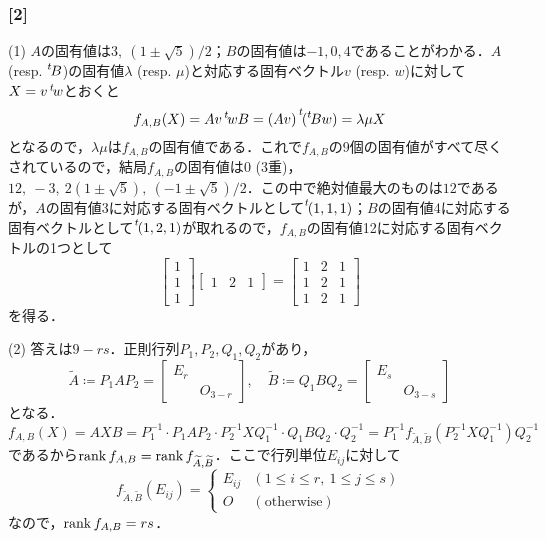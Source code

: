 \documentclass[a4j]{ltjsarticle}
\newcommand{\1}{\mathbbm{1}}
\newcommand{\transpose}[1]{\prescript{t\!}{}{#1}}
\numberwithin{equation}{section}
\theoremstyle{definition}
\begin{document}
\subsubsection*{[2]}
(1) $A$の固有値は$3,\ (1\pm\sqrt{5})/2$；$B$の固有値は$-1,0,4$であることがわかる．$A$ (resp. $\transpose{B}$)の固有値$\lambda$ (resp. $\mu$)と対応する固有ベクトル$v$ (resp. $w$)に対して$X=v\transpose{w}$とおくと 
\begin{equation}
    f_{A,B}(X)=Av\transpose{w}B=(Av)\transpose{(\transpose{B}w)}=\lambda\mu X
\end{equation}
となるので，$\lambda \mu$は$f_{A,B}$の固有値である．これで$f_{A,B}$の9個の固有値がすべて尽くされているので，結局$f_{A,B}$の固有値は$0$ (3重)，$12,\ -3,\ 2(1\pm \sqrt{5}),\ (-1\pm\sqrt{5})/2$．この中で絶対値最大のものは$12$であるが，$A$の固有値$3$に対応する固有ベクトルとして$\transpose{(1,1,1)}$；$B$の固有値$4$に対応する固有ベクトルとして$\transpose{(1,2,1)}$が取れるので，$f_{A,B}$の固有値12に対応する固有ベクトルの1つとして
\begin{equation}
    \begin{bmatrix}
        1\\
        1\\
        1
    \end{bmatrix}\begin{bmatrix}
        1 & 2 & 1 
    \end{bmatrix}=\begin{bmatrix}
        1 & 2 & 1\\
        1 & 2 & 1\\
        1 & 2 & 1
    \end{bmatrix}
\end{equation}
を得る．

(2) 答えは$9-rs$．正則行列$P_1,P_2,Q_1,Q_2$があり，
\begin{equation}
    \widetilde{A}\coloneq P_1AP_2=\begin{bmatrix}
        E_r \\
        & O_{3-r}
    \end{bmatrix},\quad \widetilde{B}\coloneq Q_1BQ_2=\begin{bmatrix}
        E_{s} \\
        & O_{3-s}
    \end{bmatrix}
\end{equation}
となる．
\begin{equation}
    f_{A,B}(X)=AXB=P_{1}^{-1}\cdot P_1AP_2\cdot P_2^{-1}XQ_{1}^{-1}\cdot Q_{1}BQ_{2}\cdot Q_{2}^{-1}=P_{1}^{-1}f_{\widetilde{A},\widetilde{B}}(P_2^{-1}XQ_{1}^{-1})Q_{2}^{-1}
\end{equation}
であるから$\rank f_{A,B}=\rank f_{\widetilde{A},\widetilde{B}}$．ここで行列単位$E_{ij}$に対して 
\begin{equation}
    f_{\widetilde{A},\widetilde{B}}(E_{ij})=\begin{cases}
        E_{ij} & (1\leq i\leq r,\ 1\leq j\leq s)\\
        O & (\text{otherwise})
    \end{cases}
\end{equation}
なので，$\rank f_{A,B}=rs$．
\end{document}
